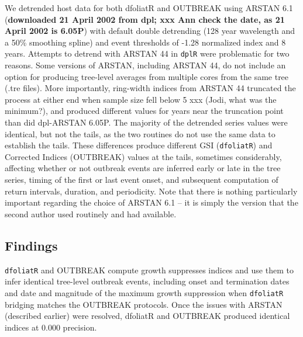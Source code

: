 \documentclass[review]{elsarticle} %
\begin{document}
We detrended host data for both dfoliatR and OUTBREAK using ARSTAN 6.1
(\textbf{downloaded 21 April 2002 from dpl; xxx Ann check the date, as
21 April 2002 is 6.05P}) with default double detrending (128 year
wavelength and a 50\% smoothing spline) and event thresholds of -1.28
normalized index and 8 years. Attempts to detrend with ARSTAN 44 in
\texttt{dplR} were problematic for two reasons. Some versions of ARSTAN,
including ARSTAN 44, do not include an option for producing tree-level
averages from multiple cores from the same tree (.tre files). More
importantly, ring-width indices from ARSTAN 44 truncated the process at
either end when sample size fell below 5 xxx (Jodi, what was the
minimum?), and produced different values for years near the truncation
point than did dpl-ARSTAN 6.05P. The majority of the detrended series
values were identical, but not the tails, as the two routines do not use
the same data to establish the tails. These differences produce
different GSI (\texttt{dfoliatR}) and Corrected Indices (OUTBREAK)
values at the tails, sometimes considerably, affecting whether or not
outbreak events are inferred early or late in the tree series, timing of
the first or last event onset, and subsequent computation of return
intervals, duration, and periodicity. Note that there is nothing
particularly important regarding the choice of ARSTAN 6.1 -- it is
simply the version that the second author used routinely and had
available.

\hypertarget{findings}{%
\subsection{Findings}\label{findings}}

\texttt{dfoliatR} and OUTBREAK compute growth suppresses indices and use
them to infer identical tree-level outbreak events, including onset and
termination dates and date and magnitude of the maximum growth
suppression when \texttt{dfoliatR} bridging matches the OUTBREAK
protocols. Once the issues with ARSTAN (described earlier) were
resolved, dfoliatR and OUTBREAK produced identical indices at 0.000
precision.
\end{document}
